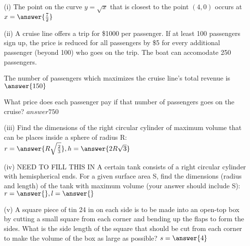\documentclass{ximera}
\begin{document}
\begin{exercise}
(i) The point on the curve $y=\sqrt{x}$ that is closest to the point $(4,0)$ occurs at $x=\answer{\frac{7}{2}}$

(ii) A cruise line offers a trip for \$1000 per passenger. If at least 100 passengers sign up, the price is reduced for all passengers by \$5 for every additional passenger (beyond 100) who goes on the trip.  The boat can accomodate 250 passengers.

The number of passengers which maximizes the cruise line's total revenue is $\answer{150}$

What price does each passenger pay if that number of passengers goes on the cruise? $answer{750}$

(iii) Find the dimensions of the right circular cylinder of maximum volume that can be places inside a sphere of radius R: $r=\answer{R\sqrt{\frac{2}{3}}}, h=\answer{2R\sqrt{3}}$

(iv) NEED TO FILL THIS IN A certain tank consists of a right circular cylinder with hemispherical ends. For a given surface area S, find the dimensions (radius and length) of the tank with maximum volume (your answer should include S): $r=\answer{}, l=\answer{}$

(v) A square piece of tin 24 in on each side is to be made into an open-top box by cutting a small square from each corner and bending up the flaps to form the sides.  What is the side length of the square that should be cut from each corner to make the volume of the box as large as possible? $s=\answer{4}$
\end{exercise}
\end{document}
